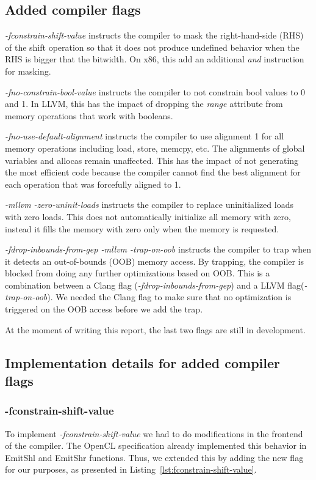 \subsection{Added compiler flags}

\textit{-fconstrain-shift-value} instructs the compiler to mask the
right-hand-side (RHS) of the shift operation so that it does not produce
undefined behavior when the RHS is bigger that the bitwidth. On x86, this add an
additional \textit{and} instruction for masking.

\textit{-fno-constrain-bool-value} instructs the compiler to not constrain bool
values to 0 and 1. In LLVM, this has the impact of dropping the \textit{range}
attribute from memory operations that work with booleans.

\textit{-fno-use-default-alignment} instructs the compiler to use alignment 1
for all memory operations including load, store, memcpy, etc. The alignments of
global variables and allocas remain unaffected. This has the impact of not
generating the most efficient code because the compiler cannot find the best
alignment for each operation that was forcefully aligned to 1.

\textit{-mllvm -zero-uninit-loads} instructs the compiler to replace
uninitialized loads with zero loads. This does not automatically initialize all
memory with zero, instead it fills the memory with zero only when the memory is
requested.

\textit{-fdrop-inbounds-from-gep -mllvm -trap-on-oob} instructs the compiler to
trap when it detects an out-of-bounds (OOB) memory access. By trapping, the
compiler is blocked from doing any further optimizations based on OOB. This is a
combination between a Clang flag (\textit{-fdrop-inbounds-from-gep}) and a LLVM
flag(\textit{-trap-on-oob}). We needed the Clang flag to make sure that no
optimization is triggered on the OOB access before we add the trap.

At the moment of writing this report, the last two flags are still in
development.

\subsection{Implementation details for added compiler flags}

\subsubsection{-fconstrain-shift-value}
To implement \textit{-fconstrain-shift-value} we had to do modifications in the
frontend of the compiler. The OpenCL specification already implemented this
behavior in EmitShl and EmitShr functions. Thus, we extended this by adding the
new flag for our purposes, as presented in
Listing~\ref{lst:fconstrain-shift-value}.


